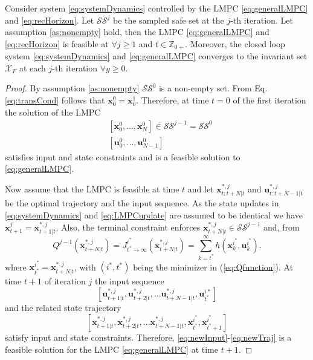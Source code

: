 \begin{theorem}
Consider system \eqref{eq:systemDynamics} controlled by the LMPC \eqref{eq:generalLMPC} and \eqref{eq:recHorizon}. Let $\mathcal{SS}^j$ be the sampled safe set at the $j$-th iteration. Let assumption \ref{as:nonempty} hold, then the LMPC \eqref{eq:generalLMPC} and \eqref{eq:recHorizon} is feasible at $\forall j\geq 1$ and $t\in \mathbb{Z}_{0+}$. Moreover, the closed loop system \eqref{eq:systemDynamics} and \eqref{eq:generalLMPC} converges to the invariant set $\mathcal{X}_F$ at each $j$-th iteration $\forall y\geq 0$.
\end{theorem}
\begin{proof}
By assumption \ref{as:nonempty} $\mathcal{SS}^0$ is a non-empty set. From Eq. \eqref{eq:transCond} follows that $\bm{x}_0^0=\bm{x}_0^1$. Therefore, at time $t=0$ of the first iteration the solution of the LMPC
\begin{align}
&[\bm{x}_0^0,...,\bm{x}_N^0]\in\mathcal{SS}^{j-1}=\mathcal{SS}^0\\
&[\bm{u}_0^0,...,\bm{u}_{N-1}^0]
\end{align}
satisfies input and state constraints and is a feasible solution to \eqref{eq:generalLMPC}.

Now assume that the LMPC is feasible at time $t$ and let $\bm{x}_{t:t+N|t}^{*,j}$ and $\bm{u}_{t:t+N-1|t}^{*,j}$ be the optimal trajectory and the input sequence. As the state updates in \eqref{eq:systemDynamics} and \eqref{eq:LMPCupdate} are assumed to be identical we have $\bm{x}_{t+1}^j=\bm{x}_{t+1|t}^{*,j}$.
Also, the terminal constraint enforces $\bm{x}^{*,j}_{t+N|t} \in \mathcal{SS}^{j-1}$ and, from 
\begin{equation}\label{eq:OptimalIndex}
Q^{j-1}(\bm{x}_{t+N|t}^{*,j}) = J^{i^*}_{t^*\rightarrow \infty}(\bm{x}_{t+N|t}^{*,j}) = \sum\limits_{k=t^*}^{\infty} h(\bm{x}_k^{i^*},\bm{u}_k^{i^*}).
\end{equation}
where $\bm{x}_{t^*}^{i^*}=\bm{x}_{t+N|t}^{*,j}$, with $(i^*, t^*)$ being the minimizer in (\ref{eq:Qfunction}).
At time $t+1$ of iteration $j$ the input sequence
\begin{equation}\label{eq:newInput}
[\bm{u}_{t+1|t}^{*,j},\bm{u}_{t+2|t}^{*,j},...\bm{u}_{t+N-1|t}^{*,j},\bm{u}_{t^*}^{i*}]
\end{equation}
and the related state trajectory
\begin{equation}\label{eq:newTraj}
[\bm{x}_{t+1|t}^{*,j},\bm{x}_{t+2|t}^{*,j},...\bm{x}_{t+N-1|t}^{*,j},\bm{x}_{t^*}^{i^*},\bm{x}_{t^*+1}^{i^*}]
\end{equation}
satisfy input and state constraints. Therefore, \eqref{eq:newInput}-\eqref{eq:newTraj} is a feasible solution for the LMPC \eqref{eq:generalLMPC} at time $t+1$.


\end{proof}
